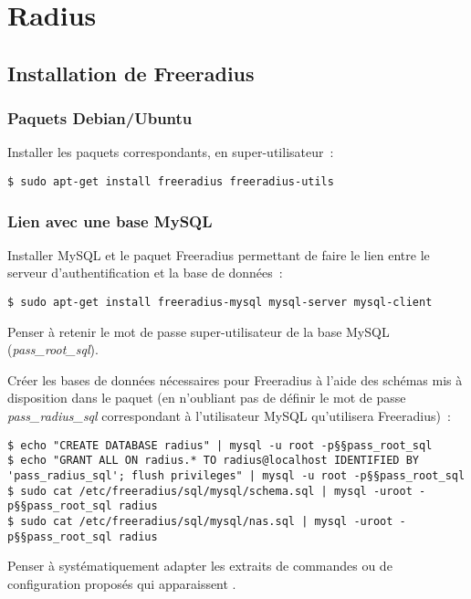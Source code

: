 \section{Radius}
\subsection{Installation de Freeradius}
\subsubsection{Paquets Debian/Ubuntu}

Installer les paquets correspondants, en super-utilisateur~:

\begin{lstlisting}
$ sudo apt-get install freeradius freeradius-utils
\end{lstlisting}

\subsubsection{Lien avec une base MySQL}

Installer MySQL et le paquet Freeradius permettant de faire le lien entre le serveur d'authentification et la base de données~:

\begin{lstlisting}
$ sudo apt-get install freeradius-mysql mysql-server mysql-client
\end{lstlisting}

Penser à retenir le mot de passe super-utilisateur de la base MySQL (\emph{pass\_root\_sql}).

Créer les bases de données nécessaires pour Freeradius à l'aide des schémas mis à disposition dans le paquet (en n'oubliant pas de définir le mot de passe \emph{pass\_radius\_sql} correspondant à l'utilisateur MySQL qu'utilisera Freeradius)~:

\begin{lstlisting}
$ echo "CREATE DATABASE radius" | mysql -u root -p§§pass_root_sql
$ echo "GRANT ALL ON radius.* TO radius@localhost IDENTIFIED BY 'pass_radius_sql'; flush privileges" | mysql -u root -p§§pass_root_sql
$ sudo cat /etc/freeradius/sql/mysql/schema.sql | mysql -uroot -p§§pass_root_sql radius
$ sudo cat /etc/freeradius/sql/mysql/nas.sql | mysql -uroot -p§§pass_root_sql radius
\end{lstlisting}

{\Large\Info} Penser à systématiquement adapter les extraits de commandes ou de configuration proposés qui apparaissent {}.

